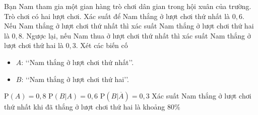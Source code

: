 \begin{ex}%
	Bạn Nam tham gia một gian hàng trò chơi dân gian trong hội xuân của trường. Trò chơi có hai lượt chơi. Xác suất để Nam thắng ở lượt chơi thứ nhất là $0{,}6$. Nếu Nam thắng ở lượt chơi thứ nhất thì xác suất Nam thắng ở lượt chơi thứ hai là $0{,}8 $. Ngược lại, nếu Nam thua ở lượt chơi thứ nhất thì xác suất Nam thắng ở lượt chơi thứ hai là $0{,}3$. Xét các biến cố
\begin{itemize}
				\item $A$: \lq\lq Nam thắng ở lượt chơi thứ nhất\rq\rq.
				\item $B$: \lq\lq Nam thắng ở lượt chơi thứ hai\rq\rq.
\end{itemize}
\choiceTF
{ $\mathrm{P}(A)=0{,}8$}
{ $\mathrm{P}\left(B|A\right) =  0{,}6$}
{\True $\mathrm{P}\left(B|\overline{A}\right) =  0{,}3$}
{\True Xác suất Nam thắng ở lượt chơi thứ nhất khi đã thắng ở lượt chơi thứ hai là khoảng $80 \%$}
\end{ex}


